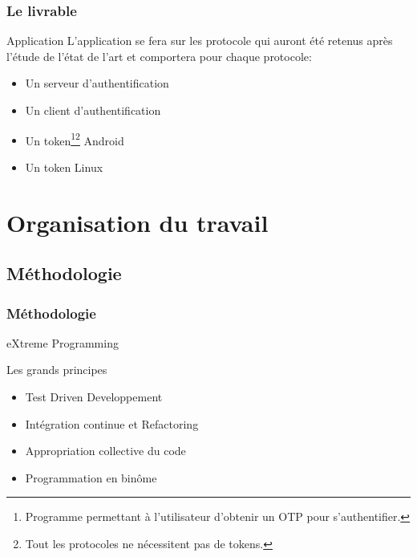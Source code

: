 \documentclass[xcolor=table]{beamer}
\begin{document}
\begin{frame}
\frametitle{Le livrable}
\begin{block}{Application}
    L'application se fera sur les protocole qui auront été retenus après l'étude de 
  l'état de l'art et comportera pour chaque protocole:
  \begin{itemize}
    \item Un serveur d'authentification
    \item Un client d'authentification
    \item Un token\footnote[1]{Programme permettant à l'utilisateur d'obtenir un 
      OTP pour s'authentifier.}\footnote[2]{Tout les protocoles ne 
      nécessitent pas de tokens.} Android
    \item Un token Linux
  \end{itemize}
\end{block}

\end{frame}


\section{Organisation du travail}

\subsection{Méthodologie}
\begin{frame}
\frametitle{Méthodologie}
\begin{center}
\Huge eXtreme Programming
\normalsize
\begin{block}{Les grands principes}
\begin{itemize}
 \item Test Driven Developpement
 \item Intégration continue et Refactoring
 \item Appropriation collective du code
 \item Programmation en binôme
\end{itemize}
\end{block}
\end{center}

\end{frame}
\end{document}
